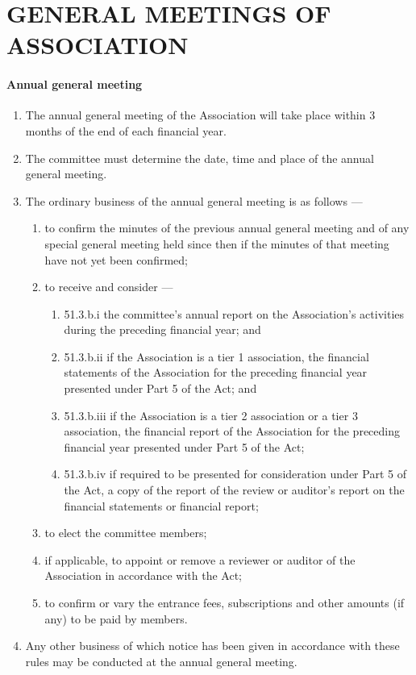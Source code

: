 \documentclass[../constitution.tex]{subfiles}
\begin{document}
\hypertarget{part-6-general-meetings-of-association}{%
\part{GENERAL MEETINGS OF ASSOCIATION}\label{part-6-general-meetings-of-association}}

\hypertarget{annual-general-meeting}{%
\subsection{Annual general meeting}\label{annual-general-meeting}}

\begin{enumerate}

\item The annual general meeting of the Association will take place within 3 months of the end of each financial year.
\item The committee must determine the date, time and place of the annual general meeting.
\item The ordinary business of the annual general meeting is as follows ---

  \begin{enumerate}
  
  \item to confirm the minutes of the previous annual general meeting and of any special general meeting held since then if the minutes of that meeting have not yet been confirmed;
  \item to receive and consider ---

    \begin{enumerate}
    
    \item 51.3.b.i the committee's annual report on the Association's activities during the preceding financial year; and
    \item 51.3.b.ii if the Association is a tier 1 association, the financial statements of the Association for the preceding financial year presented under Part 5 of the Act; and
    \item 51.3.b.iii if the Association is a tier 2 association or a tier 3 association, the financial report of the Association for the preceding financial year presented under Part 5 of the Act;
    \item 51.3.b.iv if required to be presented for consideration under Part 5 of the Act, a copy of the report of the review or auditor's report on the financial statements or financial report;
    \end{enumerate}
  \item to elect the committee members;
  \item if applicable, to appoint or remove a reviewer or auditor of the Association in accordance with the Act;
  \item to confirm or vary the entrance fees, subscriptions and other amounts (if any) to be paid by members.
  \end{enumerate}
\item Any other business of which notice has been given in accordance with these rules may be conducted at the annual general meeting.
\end{enumerate}
\end{document}
